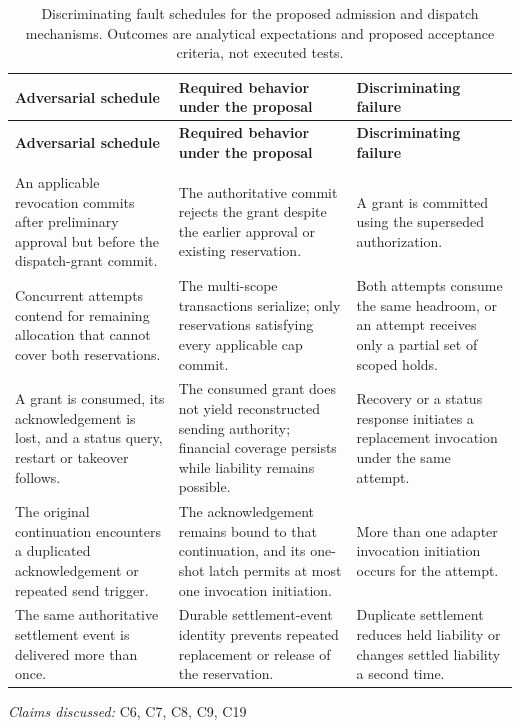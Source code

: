 \documentclass[11pt]{article}
\begin{document}
\begin{longtable}{@{}>{\raggedright\arraybackslash}p{}>{\raggedright\arraybackslash}p{}>{\raggedright\arraybackslash}p{}@{}}
\caption{Discriminating fault schedules for the proposed admission and dispatch mechanisms. Outcomes are analytical expectations and proposed acceptance criteria, not executed tests.}\\
\toprule
\textbf{Adversarial schedule} & \textbf{Required behavior under the proposal} & \textbf{Discriminating failure}\\
\midrule
\endfirsthead
\toprule
\textbf{Adversarial schedule} & \textbf{Required behavior under the proposal} & \textbf{Discriminating failure}\\
\midrule
\endhead
\midrule
\multicolumn{3}{r}{\footnotesize Continued on next page}\\
\endfoot
\bottomrule
\endlastfoot
An applicable revocation commits after preliminary approval but before the dispatch-grant commit. & The authoritative commit rejects the grant despite the earlier approval or existing reservation. & A grant is committed using the superseded authorization.\\
Concurrent attempts contend for remaining allocation that cannot cover both reservations. & The multi-scope transactions serialize; only reservations satisfying every applicable cap commit. & Both attempts consume the same headroom, or an attempt receives only a partial set of scoped holds.\\
A grant is consumed, its acknowledgement is lost, and a status query, restart or takeover follows. & The consumed grant does not yield reconstructed sending authority; financial coverage persists while liability remains possible. & Recovery or a status response initiates a replacement invocation under the same attempt.\\
The original continuation encounters a duplicated acknowledgement or repeated send trigger. & The acknowledgement remains bound to that continuation, and its one-shot latch permits at most one invocation initiation. & More than one adapter invocation initiation occurs for the attempt.\\
The same authoritative settlement event is delivered more than once. & Durable settlement-event identity prevents repeated replacement or release of the reservation. & Duplicate settlement reduces held liability or changes settled liability a second time.\\
\end{longtable}
\par{}
\textit{Claims discussed: }C6, C7, C8, C9, C19
\end{document}
